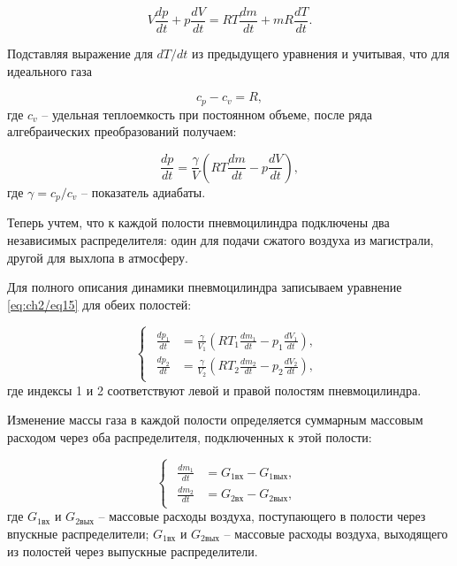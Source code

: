 \begin{equation*}
    V\frac{dp}{dt} + p\frac{dV}{dt} = RT\frac{dm}{dt} + mR\frac{dT}{dt}.
\end{equation*}

Подставляя выражение для $dT/dt$ из предыдущего уравнения и учитывая, что для идеального газа

\begin{equation*}
    c_p - c_v = R,
\end{equation*}
где $c_v$ -- удельная теплоемкость при постоянном объеме, после ряда алгебраических преобразований получаем:

\begin{equation}\label{eq:ch2/eq15}
    \frac{dp}{dt} = \frac{\gamma}{V}\left(RT\frac{dm}{dt} - p\frac{dV}{dt}\right),
\end{equation}
где $\gamma = c_p/c_v$ -- показатель адиабаты.

Теперь учтем, что к каждой полости пневмоцилиндра подключены два независимых распределителя:
один для подачи сжатого воздуха из магистрали, другой для выхлопа в атмосферу.

Для полного описания динамики пневмоцилиндра записываем уравнение \eqref{eq:ch2/eq15} для обеих полостей:

\begin{equation}\label{eq:ch2/eq16}
    \begin{cases}
        \begin{aligned}
            \frac{dp_1}{dt} & = \frac{\gamma}{V_1}\left(RT_1\frac{dm_1}{dt} - p_1\frac{dV_1}{dt}\right), \\
            \frac{dp_2}{dt} & = \frac{\gamma}{V_2}\left(RT_2\frac{dm_2}{dt} - p_2\frac{dV_2}{dt}\right),
        \end{aligned}
    \end{cases}
\end{equation}
где индексы 1 и 2 соответствуют левой и правой полостям пневмоцилиндра.

Изменение массы газа в каждой полости определяется суммарным массовым
расходом через оба распределителя, подключенных к этой полости:

\begin{equation}\label{eq:ch2/eq17}
    \begin{cases}
        \begin{aligned}
            \frac{dm_1}{dt} & = G_{1\text{вх}} - G_{1\text{вых}}, \\
            \frac{dm_2}{dt} & = G_{2\text{вх}} - G_{2\text{вых}},
        \end{aligned}
    \end{cases}
\end{equation}
где $G_{1\text{вх}}$ и $G_{2\text{вых}}$ -- массовые расходы воздуха, поступающего в полости через впускные распределители;
$G_{1\text{вх}}$ и $G_{2\text{вых}}$ -- массовые расходы воздуха, выходящего из полостей через выпускные распределители.

